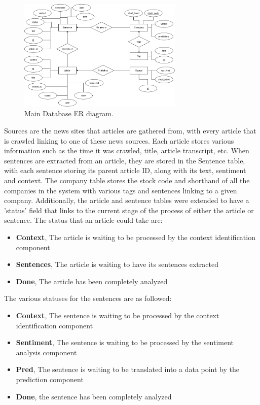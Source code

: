         \begin{figure}[!h]
            \centering
            \includegraphics[width=0.7\textwidth]{images/upload/ER full.png}
            \caption{Main Database ER diagram.}
            \label{fig:db_schema_main}
        \end{figure}
        
        Sources are the news sites that articles are gathered from, with every article that is crawled linking to one of these news sources. Each article stores various information such as the time it was crawled, title, article transcript, etc. When sentences are extracted from an article, they are stored in the Sentence table, with each sentence storing its parent article ID, along with its text, sentiment and context. The company table stores the stock code and shorthand of all the companies in the system with various tags and sentences linking to a given company. Additionally, the article and sentence tables were extended to have a 'status' field that links to the current stage of the process of either the article or sentence. The status that an article could take are:
        
        \begin{itemize}
            \item \textbf{Context}, The article is waiting to be processed by the context identification component
            \item \textbf{Sentences}, The article is waiting to have its sentences extracted
            \item \textbf{Done}, The article has been completely analyzed
        \end{itemize}
        
        The various statuses for the sentences are as followed:
        
        \begin{itemize}
            \item \textbf{Context}, The sentence is waiting to be processed by the context identification component
            \item \textbf{Sentiment}, The sentence is waiting to be processed by the sentiment analysis component
            \item \textbf{Pred}, The sentence is waiting to be translated into a data point by the prediction component
            \item \textbf{Done}, the sentence has been completely analyzed
        \end{itemize}
        
